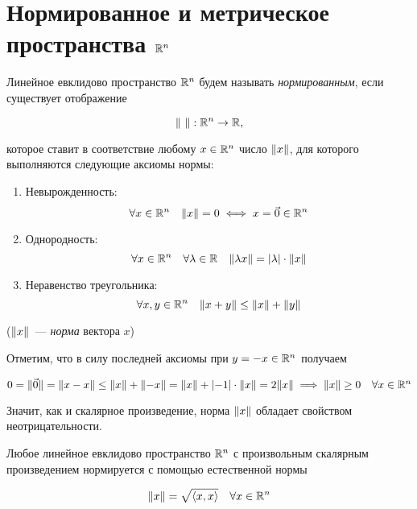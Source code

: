 \documentclass[../../main.tex]{subfiles}
\begin{document}
\section{Нормированное и метрическое пространства $\mathbb{R}^n$}

Линейное евклидово пространство $\mathbb{R}^n$ будем называть 
\textit{нормированным}, если существует отображение

\begin{equation}
 \label{norm-disp}
 \lVert\ \rVert: \mathbb{R}^n \to \mathbb{R},
\end{equation}

которое ставит в соответствие любому $x \in \mathbb{R}^n$ число $\lVert{x}\rVert$, для 
которого выполняются следующие аксиомы нормы:

\begin{enumerate}
 \item Невырожденность:
 \[\forall x \in \mathbb{R}^n \quad \lVert{x}\rVert = 0 \iff x = \vec 0 \in \mathbb{R}^n\]
 \item Однородность:
 \[\forall x \in \mathbb{R}^n \quad \forall \lambda \in \mathbb{R} \quad 
   \lVert{\lambda x}\rVert = \left|{\lambda}\right| \cdot \lVert{x}\rVert\]
 \item Неравенство треугольника:
 \[\forall x, y \in \mathbb{R}^n \quad \lVert{x+y}\rVert \le \lVert{x}\rVert + \lVert{y}\rVert\]
\end{enumerate}

($\lVert{x}\rVert$~--- \textit{норма} вектора $x$)

\bigskip

Отметим, что в силу последней аксиомы при $y = -x \in \mathbb{R}^n$ получаем

$0 = \lVert{\vec 0}\rVert = \lVert{x - x}\rVert \le \lVert{x}\rVert + \lVert{-x}\rVert =
 \lVert{x}\rVert + \left|{-1}\right| \cdot \lVert{x}\rVert = 2\lVert{x}\rVert \implies \lVert{x}\rVert \ge 0
 \quad \forall x \in \mathbb{R}^n$
 
Значит, как и скалярное произведение, норма $\lVert{x}\rVert$ обладает
свойством неотрицательности.

\begin{thm}
 Любое линейное евклидово пространство $\mathbb{R}^n$ с произвольным скалярным
 произведением нормируется с помощью естественной нормы
 
 \begin{equation}
  \label{rn-norm}
  \lVert{x}\rVert = \sqrt{\left<x, x\right>} \quad \forall x \in \mathbb{R}^n
 \end{equation}
 
\end{thm}
\end{document}
